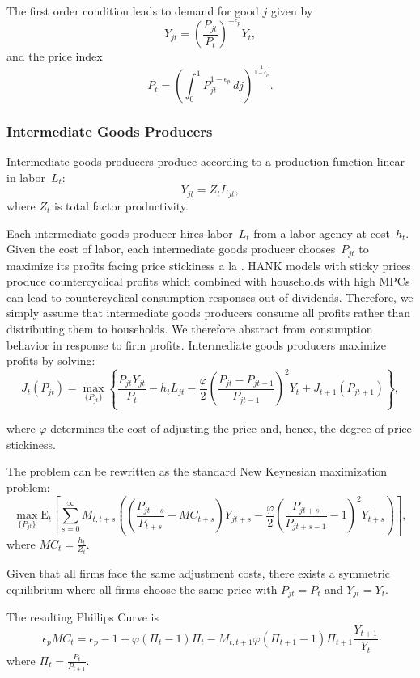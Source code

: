 \documentclass[\econtexRoot/HAFiscal]{subfiles}
\begin{document}
The first order condition leads to demand for good $j$ given by
$$Y_{jt} = \left(\frac {P_{jt}}{P_{t}}\right)^{- \epsilon_{p}} Y_{t},$$
and the price index
$$P_{t} = \left(\int_{0}^{1} P_{jt}^{1-\epsilon_{p}}\,dj \right )^{\frac{1}{1-\epsilon_{p}}}.$$


\subsubsection{Intermediate Goods Producers}

Intermediate goods producers produce according to a production function linear in labor~$L_{t}$: 
$$Y_{jt} =  Z_t L_{jt},$$ 
where $Z_t$ is total factor productivity.
  
Each intermediate goods producer hires labor~$L_{t}$ from a labor agency at cost~$h_{t}$. Given the cost of labor, each intermediate goods producer chooses~$P_{jt}$ to maximize its profits facing price stickiness a la \cite{Rotemberg1982}. HANK models with sticky prices produce countercyclical profits which combined with households with high MPCs can lead to countercyclical consumption responses out of dividends. Therefore, we simply assume that intermediate goods producers consume all profits rather than distributing them to households. We therefore abstract from consumption behavior in response to firm profits. Intermediate goods producers maximize profits by solving:
$$J_{t}\left(P_{jt}\right) = \max_{\{P_{jt}\}} \left\{\frac{P_{jt}Y_{jt}}{P_{t}} - h_{t} L_{jt} -  \frac{\varphi}{2}\left( \frac{P_{jt} - P_{jt-1}}{P_{jt-1}} \right)^{2} Y_{t}  + J_{t+1}\left(P_{jt+1}\right) \right\},$$ 

where $\varphi$ determines the cost of adjusting the price and, hence, the degree of price stickiness. 

The problem can be rewritten as the standard New Keynesian maximization problem:
$$\max_{\{P_{jt}\}} \mathrm{E}_{t}\left[\sum_{s=0}^{\infty}  M_{t,t+s} \left( \left( \frac{P_{jt+s}}{P_{t+s}} - MC_{t+s}\right)Y_{jt+s} -  \frac{\varphi}{2}\left( \frac{P_{jt+s}}{P_{jt+s-1}} - 1\right)^{2} Y_{t+s} \right)\right],$$ 
where $MC_{t} = \frac{h_{t}}{Z_{t}}$.

Given that all firms face the same adjustment costs, there exists a symmetric equilibrium where all firms choose the same price with $P_{jt}=P_{t}$ and $Y_{jt}=Y_{t}$.

The resulting Phillips Curve is
$$ \epsilon_{p} MC_{t} = \epsilon_{p} - 1 + \varphi ( \Pi_{t} -1) \Pi_{t} - M_{t,t+1} \varphi (\Pi_{t+1} -1 ) \Pi_{t+1} \frac{Y_{t+1}}{Y_{t}}$$
where $\Pi_{t} = \frac{P_{t}}{P_{t+1}}$. 
\end{document}
